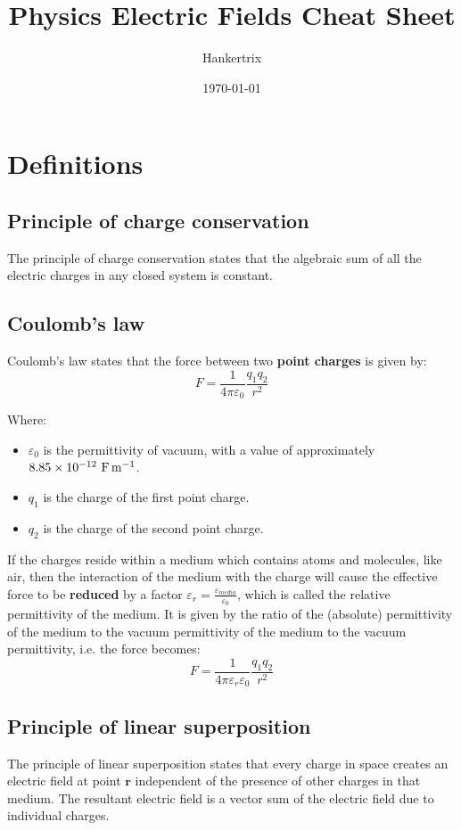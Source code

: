\documentclass[11pt]{article}
\author{Hankertrix}
\date{\today}
\title{Physics Electric Fields Cheat Sheet}
\begin{document}
\maketitle
\setcounter{tocdepth}{2}
\tableofcontents

\newpage

\section{Definitions}
\label{sec:org96c337a}

\subsection{Principle of charge conservation}
\label{sec:org33cc66f}
The principle of charge conservation states that the algebraic sum of all the electric charges in any closed system is constant.

\subsection{Coulomb's law}
\label{sec:org4706cd0}
Coulomb's law states that the force between two \textbf{point charges} is given by:
\[F = \frac{1}{4 \pi \varepsilon_0} \frac{q_1 q_2}{r^2}\]

Where:
\begin{itemize}
\item \(\varepsilon_0\) is the permittivity of vacuum, with a value of approximately \(\\ 8.85 \times 10^{-12} \ \unit{F.m^{-1}}\).
\item \(q_1\) is the charge of the first point charge.
\item \(q_2\) is the charge of the second point charge.
\end{itemize}

If the charges reside within a medium which contains atoms and molecules, like air, then the interaction of the medium with the charge will cause the effective force to be \textbf{reduced} by a factor \(\varepsilon_r = \frac{\varepsilon_{media}}{\varepsilon_0}\), which is called the relative permittivity of the medium. It is given by the ratio of the (absolute) permittivity of the medium to the vacuum permittivity of the medium to the vacuum permittivity, i.e. the force becomes:
\[F = \frac{1}{4 \pi \varepsilon_r \varepsilon_0} \frac{q_1 q_2}{r^2}\]

\newpage

\subsection{Principle of linear superposition}
\label{sec:orgc84578d}
The principle of linear superposition states that every charge in space creates an electric field at point \(\boldsymbol{r}\) independent of the presence of other charges in that medium. The resultant electric field is a vector sum of the electric field due to individual charges.
\end{document}
